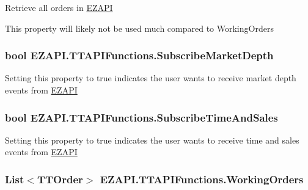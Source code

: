 Retrieve all orders in \hyperlink{namespace_e_z_a_p_i}{E\-Z\-A\-P\-I} 

This property will likely not be used much compared to Working\-Orders\hypertarget{class_e_z_a_p_i_1_1_t_t_a_p_i_functions_a2fa717eefc5d5f69004ac43e4368c9d0}{
\subsubsection[{Subscribe\-Market\-Depth}]{\setlength{\rightskip}{0pt plus 5cm}bool E\-Z\-A\-P\-I.\-T\-T\-A\-P\-I\-Functions.\-Subscribe\-Market\-Depth\hspace{0.3cm}{\ttfamily [get]}}}\label{class_e_z_a_p_i_1_1_t_t_a_p_i_functions_a2fa717eefc5d5f69004ac43e4368c9d0}


Setting this property to true indicates the user wants to receive market depth events from \hyperlink{namespace_e_z_a_p_i}{E\-Z\-A\-P\-I} 

\hypertarget{class_e_z_a_p_i_1_1_t_t_a_p_i_functions_a96e35a16a2ba3b3975b0918562b12837}{
\subsubsection[{Subscribe\-Time\-And\-Sales}]{\setlength{\rightskip}{0pt plus 5cm}bool E\-Z\-A\-P\-I.\-T\-T\-A\-P\-I\-Functions.\-Subscribe\-Time\-And\-Sales\hspace{0.3cm}{\ttfamily [get]}}}\label{class_e_z_a_p_i_1_1_t_t_a_p_i_functions_a96e35a16a2ba3b3975b0918562b12837}


Setting this property to true indicates the user wants to receive time and sales events from \hyperlink{namespace_e_z_a_p_i}{E\-Z\-A\-P\-I} 

\hypertarget{class_e_z_a_p_i_1_1_t_t_a_p_i_functions_a287d18ca810f4a76e13f9bb081de50d6}{
\subsubsection[{Working\-Orders}]{\setlength{\rightskip}{0pt plus 5cm}List$<${\bf T\-T\-Order}$>$ E\-Z\-A\-P\-I.\-T\-T\-A\-P\-I\-Functions.\-Working\-Orders\hspace{0.3cm}{\ttfamily [get]}}}\label{class_e_z_a_p_i_1_1_t_t_a_p_i_functions_a287d18ca810f4a76e13f9bb081de50d6}


